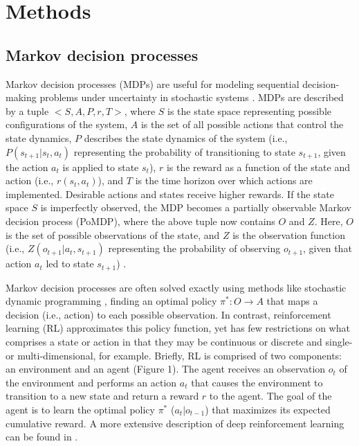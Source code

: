 \documentclass{article}
\begin{document}
\section{Methods}

\subsection{Markov decision processes}

Markov decision processes (MDPs) are useful for modeling sequential decision-making problems under uncertainty in stochastic systems \parencite{bellman1957markovian}. MDPs are described by a tuple $<S, A, P, r, T>$, where $S$ is the state space representing possible configurations of the system, $A$ is the set of all possible actions that control the state dynamics, $P$ describes the state dynamics of the system (i.e., $P(s_{t+1}|s_t,a_t)$ representing the probability of transitioning to state $s_{t+1}$, given the action $a_t$ is applied to state $s_t$), $r$ is the reward as a function of the state and action (i.e., $r(s_t, a_t)$), and $T$ is the time horizon over which actions are implemented. Desirable actions and states receive higher rewards. If the state space $S$ is imperfectly observed, the MDP becomes a partially observable Markov decision process (PoMDP), where the above tuple now contains $O$ and $Z$. Here, $O$ is the set of possible observations of the state, and $Z$ is the observation function (i.e., $Z(o_{t+1}|a_t,s_{t+1})$ representing the probability of observing $o_{t+1}$, given that action $a_t$ led to state $s_{t+1}$) \parencite{chades2021primer}.

Markov decision processes are often solved exactly using methods like stochastic dynamic programming \parencite{marescot2013complex}, finding an optimal policy $\pi^*: O \rightarrow A$ that maps a decision (i.e., action) to each possible observation. In contrast, reinforcement learning (RL) approximates this policy function, yet has few restrictions on what comprises a state or action in that they may be continuous or discrete and single- or multi-dimensional, for example. Briefly, RL is comprised of two components: an environment and an agent (Figure 1). The agent receives an observation $o_t$ of the environment and performs an action $a_t$ that causes the environment to transition to a new state and return a reward $r$ to the agent. The goal of the agent is to learn the optimal policy $\pi^*$ ($a_t|o_{t-1}$) that maximizes its expected cumulative reward. A more extensive description of deep reinforcement learning can be found in \textcite{lapeyrolerie2022deep}. 
\end{document}
